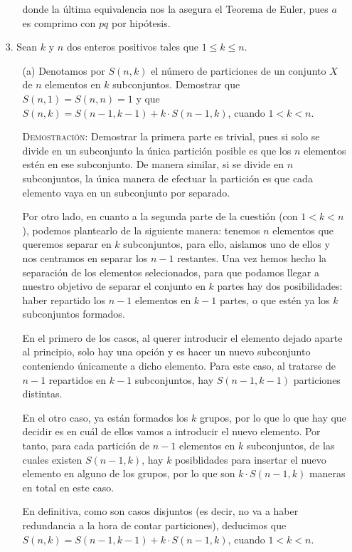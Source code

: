 \documentclass{article}
\begin{document}
\begin{enumerate}
\begin{enumerate}
        donde la última equivalencia nos la asegura el Teorema de Euler, pues $a$ es comprimo con $pq$ por hipótesis.
    \end{enumerate}

    \newpage

    \item[3.] Sean $k$ y $n$ dos enteros positivos tales que $1 \leq k \leq n$.

    \begin{enumerate}
        \item[(a)] Denotamos por $S(n, k)$ el número de particiones de un conjunto $X$ de $n$ elementos en $k$ subconjuntos. Demostrar que $S(n, 1) = S(n, n) = 1$ y que $S(n, k) = S(n - 1, k - 1) + k \cdot S(n - 1, k)$, cuando $1 < k < n$.

        \textsc{Demostración:} Demostrar la primera parte es trivial, pues si solo se divide en un subconjunto la única partición posible es que los $n$ elementos estén en ese subconjunto. De manera similar, si se divide en $n$ subconjuntos, la única manera de efectuar la partición es que cada elemento vaya en un subconjunto por separado.

        Por otro lado, en cuanto a la segunda parte de la cuestión (con $1 < k < n$), podemos plantearlo de la siguiente manera: tenemos $n$ elementos que queremos separar en $k$ subconjuntos, para ello, aislamos uno de ellos y nos centramos en separar los $n - 1$ restantes. Una vez hemos hecho la separación de los elementos selecionados, para que podamos llegar a nuestro objetivo de separar el conjunto en $k$ partes hay dos posibilidades: haber repartido los $n - 1$ elementos en $k - 1$ partes, o que estén ya los $k$ subconjuntos formados. 
        
        En el primero de los casos, al querer introducir el elemento dejado aparte al principio, solo hay una opción y es hacer un nuevo subconjunto conteniendo únicamente a dicho elemento. Para este caso, al tratarse de $n - 1$ repartidos en $k - 1$ subconjuntos, hay $S(n - 1, k - 1)$ particiones distintas.
        
        En el otro caso, ya están formados los $k$ grupos, por lo que lo que hay que decidir es en cuál de ellos vamos a introducir el nuevo elemento. Por tanto, para cada partición de $n - 1$ elementos en $k$ subconjuntos, de las cuales existen $S(n - 1, k)$, hay $k$ posiblidades para insertar el nuevo elemento en alguno de los grupos, por lo que son $k \cdot S(n - 1, k)$ maneras en total en este caso.

        En definitiva, como son casos disjuntos (es decir, no va a haber redundancia a la hora de contar particiones), deducimos que $S(n, k) = S(n - 1, k - 1) + k \cdot S(n - 1, k)$, cuando $1 < k < n$.
    \end{enumerate}
\end{enumerate}
\end{document}
